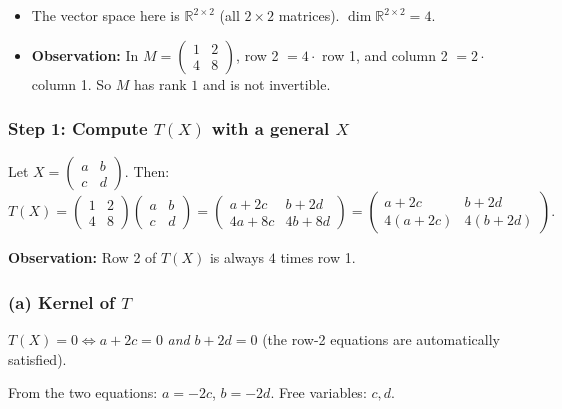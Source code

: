 \documentclass[a4paper,12pt]{article}
\begin{document}
\begin{begriffe}
\begin{itemize}[leftmargin=*, nosep]
    \item The vector space here is $\mathbb{R}^{2 \times 2}$ (all $2\times 2$ matrices). $\dim \mathbb{R}^{2\times 2} = 4$.
    \item \textbf{Observation:} In $M = \begin{pmatrix} 1 & 2 \\ 4 & 8 \end{pmatrix}$, row 2 $= 4 \cdot$ row 1, and column 2 $= 2 \cdot$ column 1. So $M$ has rank $1$ and is not invertible.
\end{itemize}
\end{begriffe}

\subsubsection*{Step 1: Compute $T(X)$ with a general $X$}

Let $X = \begin{pmatrix} a & b \\ c & d \end{pmatrix}$. Then:
\[
T(X) = \begin{pmatrix} 1 & 2 \\ 4 & 8 \end{pmatrix} \begin{pmatrix} a & b \\ c & d \end{pmatrix}
= \begin{pmatrix} a + 2c & b + 2d \\ 4a + 8c & 4b + 8d \end{pmatrix}
= \begin{pmatrix} a + 2c & b + 2d \\ 4(a + 2c) & 4(b + 2d) \end{pmatrix}.
\]

\textbf{Observation:} Row 2 of $T(X)$ is always $4$ times row 1.

\subsubsection*{(a) Kernel of $T$}

$T(X) = 0 \iff a + 2c = 0$ \emph{and} $b + 2d = 0$ (the row-2 equations are automatically satisfied).

From the two equations: $a = -2c$, $b = -2d$. Free variables: $c, d$.
\end{document}
